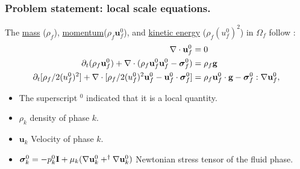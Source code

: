 \documentclass{sintefbeamer}
\begin{document}
\begin{frame}
  \frametitle{Problem statement: local scale equations.}
  The \underline{mass} ($\rho_f$), \underline{momentum}($\rho_f \textbf{u}_f^0$), and \underline{kinetic energy} ($\rho_f (u_f^0)^2$)  in $\Omega_f$ follow :
\begin{align}
  \mathbf{\nabla}\cdot  \textbf{u}_f^0
  &= 
  0
  \\
  \partial_t (\rho_f \textbf{u}_f^0)  
  + \mathbf{\nabla}\cdot (
      \rho_f \textbf{u}_f^0\textbf{u}_f^0
      - \bm{\sigma}_f^0 
      )
  &= 
  \rho_f \textbf{g}\\
  \partial_t [\rho_f/2(u_f^0)^2]  
  + \mathbf{\nabla}\cdot [\rho_f/2(u_f^0)^2\textbf{u}_f^0 - \textbf{u}_f^0 \cdot \bm{\sigma}_f^0]
  &=
  \rho_f\textbf{u}_f^0 \cdot \textbf{g}  
  -  \bm{\sigma}_f^0 : \mathbf{\nabla} \textbf{u}_f^0,
\end{align}
\begin{definition}
  \begin{itemize}
    \item The superscript $^0$ indicated that it is a local quantity.
    \item $\rho_k$  density of phase $k$. 
    \item $\textbf{u}_k$  Velocity of phase $k$.
    \item $\bm\sigma_k^0 = -p_k^0 \textbf{I} + \mu_k (\mathbf{\nabla} \textbf{u}_k^0+^\dagger\mathbf{\nabla} \textbf{u}_k^0)$ Newtonian stress tensor of the fluid phase. 
  \end{itemize}
\end{definition}

\end{frame}


  
\end{document}
